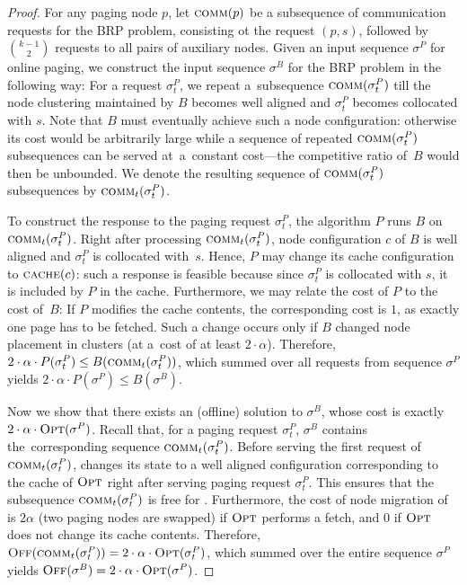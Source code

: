 \begin{proof}
For any paging node $p$, let $\textsc{comm}(p)$ be a subsequence of communication
requests for the BRP problem, consisting ot the request $(p, s)$, followed by
$\binom{k-1}{2}$ requests to all pairs of auxiliary nodes. Given an input
sequence $\sigma^P$ for online paging, we construct the input sequence
$\sigma^B$ for the BRP problem in the following way: For a request
$\sigma^P_t$, we repeat a~subsequence $\textsc{comm}(\sigma^P_t)$ till the node
clustering maintained by $B$ becomes well aligned and $\sigma^P_t$ becomes
collocated with $s$. Note that $B$ must eventually achieve such a node
configuration: otherwise its cost would be arbitrarily large while a sequence
of repeated $\textsc{comm}(\sigma^P_t)$ subsequences can be served at~a~constant
cost---the competitive ratio of~$B$ would then be unbounded. We denote the
resulting sequence of $\textsc{comm}(\sigma^P_t)$ subsequences by
$\textsc{comm}_t(\sigma^P_t)$.

To construct the response to the paging request $\sigma^P_t$, the algorithm
$P$ runs $B$ on $\textsc{comm}_t(\sigma^P_t)$. Right after processing
$\textsc{comm}_t(\sigma^P_t)$, node configuration $c$ of $B$ is well aligned and
$\sigma^P_t$ is collocated with~$s$. Hence, $P$ may change its cache
configuration to $\textsc{cache}(c)$: such a response is feasible because
since $\sigma^P_t$ is collocated with $s$, it is included by $P$ in the cache.
Furthermore, we may relate the cost of $P$ to the cost of~$B$: If $P$ modifies
the cache contents, the corresponding cost is $1$, as exactly one page has to
be fetched. Such a change occurs only if $B$ changed node placement in
clusters (at a~cost of at least $2 \cdot \alpha$). Therefore, $2
\cdot \alpha \cdot P(\sigma^P_t) \leq B(\textsc{comm}_t(\sigma^P_t))$, which
summed over all requests from sequence $\sigma^P$ yields $2 \cdot
\alpha \cdot P(\sigma^P) \leq B(\sigma^B)$.

Now we show that there exists an (offline) solution \OFF to $\sigma^B$, whose
cost is exactly $2 \cdot \alpha \cdot \textsc{Opt}(\sigma^P)$. Recall that, for a
paging request $\sigma^P_t$, $\sigma^B$ contains the~corresponding sequence
$\textsc{comm}_t(\sigma^P_t)$. Before serving the first request
of~$\textsc{comm}_t(\sigma^P_t)$, \OFF changes its state to a well aligned
configuration corresponding to the cache of $\textsc{Opt}$ right after serving paging
request $\sigma^P_t$. This ensures that the subsequence $\textsc{comm}_t(\sigma^P_t)$
is free for \OFF. Furthermore, the cost of node migration of \OFF is $2
\alpha$ (two paging nodes are swapped) if $\textsc{Opt}$ performs a fetch, and 0 if
$\textsc{Opt}$ does not change its cache contents. Therefore,
$\textsc{Off}(\textsc{comm}_t(\sigma^P_t)) = 2 \cdot \alpha \cdot \textsc{Opt}(\sigma^P_t)$, which
summed over the entire sequence $\sigma^P$ yields $\textsc{Off}(\sigma^B) = 2 \cdot
\alpha \cdot \textsc{Opt}(\sigma^P)$.


\end{proof}
